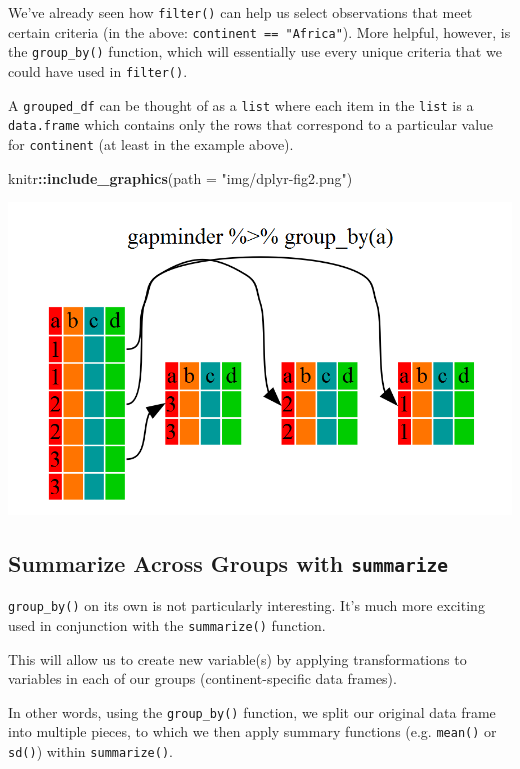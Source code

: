 \documentclass[]{book}
\newenvironment{Shaded}{\begin{snugshade}}{\end{snugshade}}
\newcommand{\KeywordTok}[1]{\textcolor[rgb]{0.13,0.29,0.53}{\textbf{#1}}}
\newcommand{\DataTypeTok}[1]{\textcolor[rgb]{0.13,0.29,0.53}{#1}}
\newcommand{\StringTok}[1]{\textcolor[rgb]{0.31,0.60,0.02}{#1}}
\newcommand{\OperatorTok}[1]{\textcolor[rgb]{0.81,0.36,0.00}{\textbf{#1}}}
\newcommand{\NormalTok}[1]{#1}
\begin{document}
We've already seen how \texttt{filter()} can help us select observations
that meet certain criteria (in the above:
\texttt{continent\ ==\ "Africa"}). More helpful, however, is the
\texttt{group\_by()} function, which will essentially use every unique
criteria that we could have used in \texttt{filter()}.

A \texttt{grouped\_df} can be thought of as a \texttt{list} where each
item in the \texttt{list} is a \texttt{data.frame} which contains only
the rows that correspond to a particular value for \texttt{continent}
(at least in the example above).

\begin{Shaded}
\begin{Highlighting}[]
\NormalTok{knitr}\OperatorTok{::}\KeywordTok{include_graphics}\NormalTok{(}\DataTypeTok{path =} \StringTok{"img/dplyr-fig2.png"}\NormalTok{)}
\end{Highlighting}
\end{Shaded}

\begin{center}\includegraphics[width=0.7\linewidth]{img/dplyr-fig2} \end{center}

\subsection{\texorpdfstring{Summarize Across Groups with
\texttt{summarize}}{Summarize Across Groups with summarize}}\label{summarize-across-groups-with-summarize}

\texttt{group\_by()} on its own is not particularly interesting. It's
much more exciting used in conjunction with the \texttt{summarize()}
function.

This will allow us to create new variable(s) by applying transformations
to variables in each of our groups (continent-specific data frames).

In other words, using the \texttt{group\_by()} function, we split our
original data frame into multiple pieces, to which we then apply summary
functions (e.g. \texttt{mean()} or \texttt{sd()}) within
\texttt{summarize()}.
\end{document}
